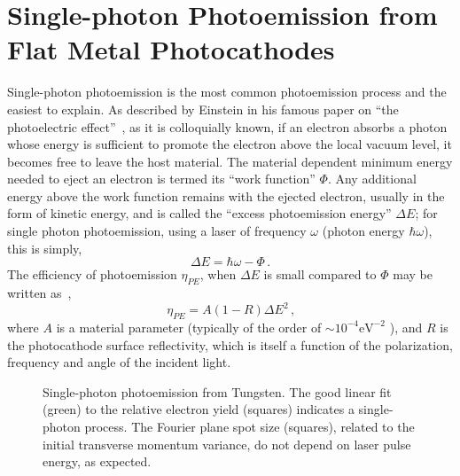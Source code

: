 
\section{Single-photon Photoemission from Flat Metal Photocathodes} \label{sec:single_photon}

Single-photon photoemission is the most common photoemission process and the easiest to explain.
As described by Einstein in his famous paper on ``the photoelectric effect''~\cite{einstein_uber_1905}, as it is colloquially known, if an electron absorbs a photon whose energy is sufficient to promote the electron above the local vacuum level, it becomes free to leave the host material.
The material dependent minimum energy needed to eject an electron is termed its ``work function'' $\Phi$.
Any additional energy above the work function remains with the ejected electron, usually in the form of kinetic energy, and is called the ``excess photoemission energy'' $\Delta E$; for single photon photoemission, using a laser of frequency $\omega$ (photon energy $\hbar \omega$), this is simply,
\begin{equation}
  \Delta E = \hbar \omega - \Phi \,\text{.}
\end{equation}
The efficiency of photoemission $\eta_{{\scriptscriptstyle PE}}$, when $\Delta E$ is small compared to $\Phi$ may be written as~\cite{fowler_analysis_1931,dowell_quantum_2009,maldonado_experimental_2012},
\begin{equation}
  \eta_{{\scriptscriptstyle PE}} = A ( 1 - R ) \Delta E^2 \,\text{,}
\end{equation}
where $A$ is a material parameter (typically of the order of $\sim 10^{-4} \text{eV}^{-2}$
), and $R$ is the photocathode surface reflectivity, which is itself a function of the polarization, frequency and angle of the incident light.


\begin{figure}
  \centering
  
  \caption[Single-photon photoemission from Tungsten]{
    Single-photon photoemission from Tungsten.
    The good linear fit (green) to the relative electron yield (squares) indicates a single-photon process.
    The Fourier plane spot size (squares), related to the initial transverse momentum variance, do not depend on laser pulse energy, as expected.
  }
  \label{fig:single_photon_tungsten}
\end{figure}

